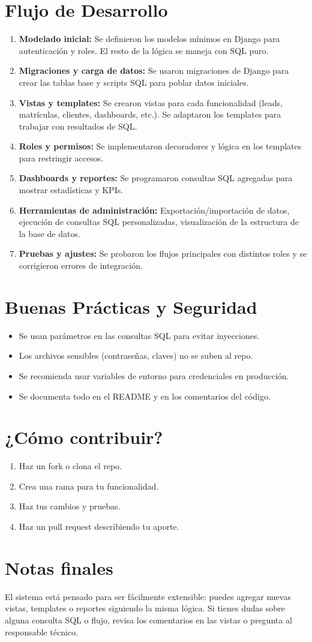\documentclass[12pt,a4paper]{article}
\begin{document}
\section{Flujo de Desarrollo}
\begin{enumerate}
    \item \textbf{Modelado inicial:} Se definieron los modelos mínimos en Django para autenticación y roles. El resto de la lógica se maneja con SQL puro.
    \item \textbf{Migraciones y carga de datos:} Se usaron migraciones de Django para crear las tablas base y scripts SQL para poblar datos iniciales.
    \item \textbf{Vistas y templates:} Se crearon vistas para cada funcionalidad (leads, matrículas, clientes, dashboards, etc.). Se adaptaron los templates para trabajar con resultados de SQL.
    \item \textbf{Roles y permisos:} Se implementaron decoradores y lógica en los templates para restringir accesos.
    \item \textbf{Dashboards y reportes:} Se programaron consultas SQL agregadas para mostrar estadísticas y KPIs.
    \item \textbf{Herramientas de administración:} Exportación/importación de datos, ejecución de consultas SQL personalizadas, visualización de la estructura de la base de datos.
    \item \textbf{Pruebas y ajustes:} Se probaron los flujos principales con distintos roles y se corrigieron errores de integración.
\end{enumerate}

\section{Buenas Prácticas y Seguridad}
\begin{itemize}
    \item Se usan parámetros en las consultas SQL para evitar inyecciones.
    \item Los archivos sensibles (contraseñas, claves) no se suben al repo.
    \item Se recomienda usar variables de entorno para credenciales en producción.
    \item Se documenta todo en el README y en los comentarios del código.
\end{itemize}

\section{¿Cómo contribuir?}
\begin{enumerate}
    \item Haz un fork o clona el repo.
    \item Crea una rama para tu funcionalidad.
    \item Haz tus cambios y pruebas.
    \item Haz un pull request describiendo tu aporte.
\end{enumerate}

\section{Notas finales}
El sistema está pensado para ser fácilmente extensible: puedes agregar nuevas vistas, templates o reportes siguiendo la misma lógica. Si tienes dudas sobre alguna consulta SQL o flujo, revisa los comentarios en las vistas o pregunta al responsable técnico.
\end{document}
